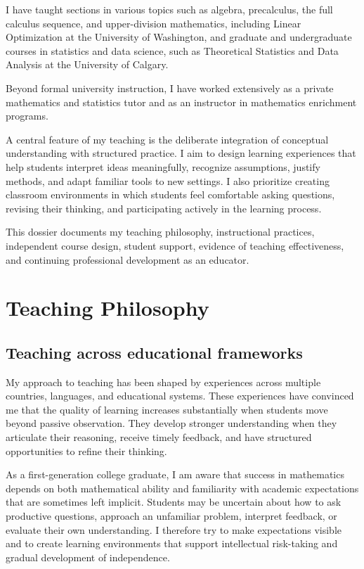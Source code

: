 \documentclass[11pt]{article}
\begin{document}
I have taught sections in various topics such as algebra, precalculus,
the full calculus sequence, and upper-division mathematics,
including Linear Optimization at the University of Washington, and graduate and undergraduate courses in statistics and data science, such as Theoretical Statistics and Data Analysis at the University of Calgary. 

Beyond formal university instruction,
I have worked extensively as a private mathematics and
statistics tutor and as an instructor in mathematics
enrichment programs.

A central feature of my teaching is the deliberate integration
of conceptual understanding with structured practice.
I aim to design learning experiences that help students
interpret ideas meaningfully, recognize assumptions,
justify methods, and adapt familiar tools to new
settings.
I also prioritize creating classroom environments in which
students feel comfortable asking questions,
revising their thinking,
and participating actively in the learning process.

This dossier documents my teaching philosophy,
instructional practices,
independent course design,
student support,
evidence of teaching effectiveness,
and continuing professional development as an educator.


\section{Teaching Philosophy}

\subsection{Teaching across educational frameworks}

My approach to teaching has been shaped by experiences across
multiple countries, languages, and educational systems.
These experiences have convinced me that the quality of
learning increases substantially when students move beyond
passive observation.
They develop stronger understanding when they articulate
their reasoning, receive timely feedback,
and have structured opportunities to refine their thinking.

As a first-generation college graduate,
I am aware that success in mathematics depends on both
 mathematical ability and familiarity with academic
expectations that are sometimes left implicit.
Students may be uncertain about how to ask
productive questions, approach an unfamiliar problem,
interpret feedback, or evaluate their own understanding.
I therefore try to make expectations visible and to create
learning environments that support intellectual risk-taking
and gradual development of independence.
\end{document}
